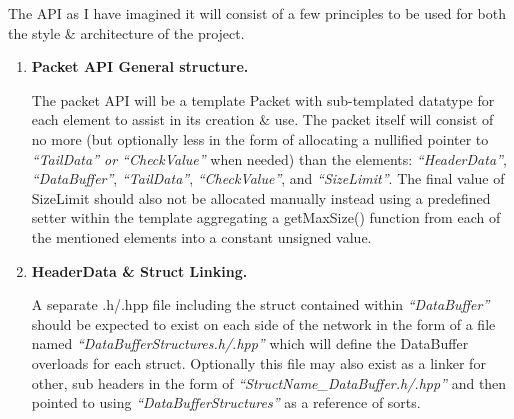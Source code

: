 \documentclass{article}
\begin{document}
The API as I have imagined it will consist of a few principles to be used for both the style \& architecture of the project.
\begin{enumerate}
	\item \textbf{Packet API General structure.}

	      The packet API will be a template Packet with sub-templated datatype for each element to assist in its creation \& use. The packet itself will consist of no more (but optionally less in the form of allocating a nullified pointer to \textit{``TailData'' or ``CheckValue''} when needed) than the elements: \textit{``HeaderData''}, \textit{``DataBuffer''}, \textit{``TailData''}, \textit{``CheckValue''}, and \textit{``SizeLimit''}. The final value of SizeLimit should also not be allocated manually instead using a predefined setter within the template aggregating a getMaxSize() function from each of the mentioned elements into a constant unsigned value.

	\item \textbf{HeaderData \& Struct Linking.}

	      A separate .h/.hpp file including the struct contained within \textit{``DataBuffer''} should be expected to exist on each side of the network in the form of a file named \textit{``DataBufferStructures.h/.hpp''} which will define the DataBuffer overloads for each struct. Optionally this file may also exist as a linker for other, sub headers in the form of \textit{``StructName\_DataBuffer.h/.hpp''} and then pointed to using \textit{``DataBufferStructures''} as a reference of sorts.


\end{enumerate}
\end{document}
